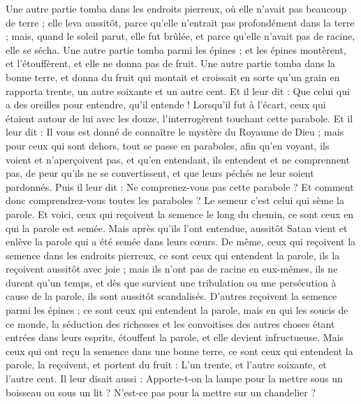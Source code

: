 \begin{multicols}{2}
Une autre partie tomba dans les endroits pierreux, où elle n'avait pas beaucoup de terre ; elle leva aussitôt, parce qu'elle n'entrait pas profondément dans la terre ;
mais, quand le soleil parut, elle fut brûlée, et parce qu'elle n'avait pas de racine, elle se sécha.
Une autre partie tomba parmi les épines ; et les épines montèrent, et l'étouffèrent, et elle ne donna pas de fruit.
Une autre partie tomba dans la bonne terre, et donna du fruit qui montait et croissait en sorte qu'un grain en rapporta trente, un autre soixante et un autre cent.
Et il leur dit : Que celui qui a des oreilles pour entendre, qu'il entende !
Lorsqu'il fut à l'écart, ceux qui étaient autour de lui avec les douze, l'interrogèrent touchant cette parabole.
Et il leur dit : Il vous est donné de connaître le mystère du Royaume de Dieu ; mais pour ceux qui sont dehors, tout se passe en paraboles,
afin qu'en voyant, ils voient et n'aperçoivent pas, et qu'en entendant, ils entendent et ne comprennent pas, de peur qu'ils ne se convertissent, et que leurs péchés ne leur soient pardonnés.
Puis il leur dit : Ne comprenez-vous pas cette parabole ? Et comment donc comprendrez-vous toutes les paraboles ?
Le semeur c'est celui qui sème la parole.
Et voici, ceux qui reçoivent la semence le long du chemin, ce sont ceux en qui la parole est semée. Mais après qu'ils l'ont entendue, aussitôt Satan vient et enlève la parole qui a été semée dans leurs cœurs.
De même, ceux qui reçoivent la semence dans les endroits pierreux, ce sont ceux qui entendent la parole, ils la reçoivent aussitôt avec joie ;
mais ils n'ont pas de racine en eux-mêmes, ils ne durent qu'un temps, et dès que survient une tribulation ou une persécution à cause de la parole, ils sont aussitôt scandalisés.
D'autres reçoivent la semence parmi les épines ; ce sont ceux qui entendent la parole,
mais en qui les soucis de ce monde, la séduction des richesses et les convoitises des autres choses étant entrées dans leurs esprits, étouffent la parole, et elle devient infructueuse.
Mais ceux qui ont reçu la semence dans une bonne terre, ce sont ceux qui entendent la parole, la reçoivent, et portent du fruit : L'un trente, et l'autre soixante, et l'autre cent.
Il leur disait aussi : Apporte-t-on la lampe pour la mettre sous un boisseau ou sous un lit ? N'est-ce pas pour la mettre sur un chandelier ?

\end{multicols}
